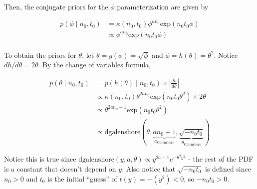 \documentclass[
]{article}
\begin{document}
Then, the conjugate priors for the \(\phi\) parameterization are given
by

\begin{align}
p(\phi \mid n_0, t_0) &= \kappa (n_0, t_0) \phi^{a n_0} \text{exp}(n_0 t_0 \phi) \\
&\propto \phi^{a n_0} \text{exp}(n_0 t_0 \phi) \\
\end{align}

To obtain the priors for \(\theta\), let
\(\theta = g(\phi) = \sqrt{\phi}\) and \(\phi = h(\theta) = \theta^2\).
Notice \(dh/d\theta = 2\theta\). By the change of variables formula,

\begin{align}
p(\theta \mid n_0, t_0) &= p(h(\theta) \mid n_0, t_0) \times \left| \frac{dh}{d\theta} \right| \\
&\propto \kappa(n_0, t_0) \theta^{2a n_0} \text{exp}\left( n_0 t_0 \theta^2 \right) \times 2 \theta \\
&\propto \theta^{2a n_0 + 1} \text{exp}\left( n_0 t_0 \theta^2 \right) \\
&\propto \text{dgalenshore}\left(\theta, \underbrace{a n_0 + 1}_{a_{\text{Galenshore}}}, \underbrace{\sqrt{-n_0 t_0}}_{\theta_{\text{Galenshore}}} \right)
\end{align}

Notice this is true since
\(\text{dgalenshore}(y, a, \theta) \propto y^{2a - 1} e^{- \theta^2 y^2}\)
- the rest of the PDF is a constant that doesn't depend on \(y\). Also
notice that \(\sqrt{-n_0 t_0}\) is defined since \(n_0 > 0\) and \(t_0\)
is the initial ``guess'' of \(t(y) = - (y^2) < 0\), so \(-n_0 t_0 > 0\).
\end{document}
